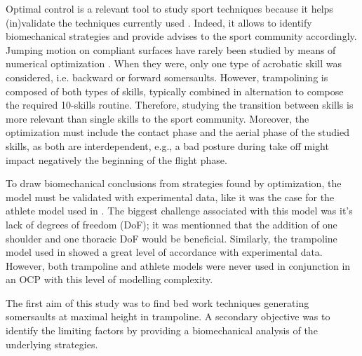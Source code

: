 Optimal control is a relevant tool to study sport techniques because it helps (in)validate the techniques currently used \cite{charbonneau2020optimal}.
Indeed, it allows to identify biomechanical strategies and provide advises to the sport community accordingly.
Jumping motion on compliant surfaces have rarely been studied by means of numerical optimization \cite{cheng2008role, burke2015mechanics}.
When they were, only one type of acrobatic skill was considered, i.e. backward or forward somersaults.
However, trampolining is composed of both types of skills, typically combined in alternation to compose the required 10-skills routine. 
Therefore, studying the transition between skills is more relevant than single skills to the sport community.
Moreover, the optimization must include the contact phase and the aerial phase of the studied skills, as both are interdependent, e.g., a bad posture during take off might impact negatively the beginning of the flight phase. 


To draw biomechanical conclusions from strategies found by optimization, the model must be validated with experimental data, like it was the case for the athlete model used in \cite{burke2015mechanics}.
The biggest challenge associated with this model was it's lack of degrees of freedom (DoF); it was mentionned that the addition of one shoulder and one thoracic DoF would be beneficial.
Similarly, the trampoline model used in \cite{jacques2008determining} showed a great level of accordance with experimental data.
However, both trampoline and athlete models were never used in conjunction in an OCP with this level of modelling complexity.


The first aim of this study was to find bed work techniques  generating somersaults at maximal height in trampoline. 
A secondary objective was to identify the limiting factors by providing a biomechanical analysis of the underlying strategies.


